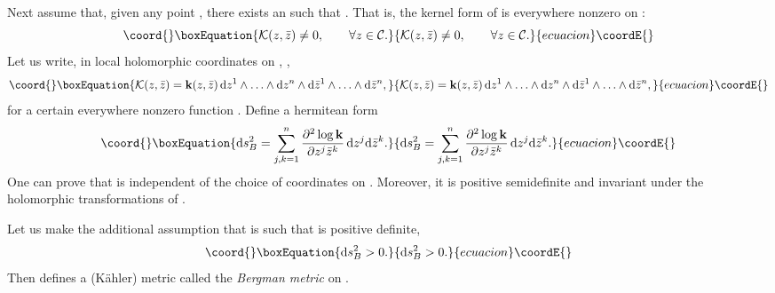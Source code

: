 \documentclass[a4paper,a4paper]{article}
\begin{document}
Next assume that, given any point \coordHE{}, there exists an 
\coordHE{} such that \coordHE{}. That is, the kernel form 
\coordHE{} of \coordHE{} is everywhere nonzero on \coordHE{}:
\begin{equation}\coord{}\boxEquation{
{\cal K}(z,\bar z)\neq 0,\qquad \forall z\in{\cal C}.
\label{knz}
}{
{\cal K}(z,\bar z)\neq 0,\qquad \forall z\in{\cal C}.
}{ecuacion}\coordE{}\end{equation}
Let us write, in local holomorphic coordinates \coordHE{} on \coordHE{},  \coordHE{},
\begin{equation}\coord{}\boxEquation{
{\cal K}(z,\bar z)={\bf k}(z, \bar z)\,{\rm d}z^1\wedge\ldots\wedge{\rm d}z^n\wedge{\rm d}\bar 
z^1\wedge\ldots\wedge{\rm d}\bar z^n,
\label{kicco}
}{
{\cal K}(z,\bar z)={\bf k}(z, \bar z)\,{\rm d}z^1\wedge\ldots\wedge{\rm d}z^n\wedge{\rm d}\bar 
z^1\wedge\ldots\wedge{\rm d}\bar z^n,
}{ecuacion}\coordE{}\end{equation}
for a certain everywhere nonzero function \coordHE{}. 
Define a hermitean form \coordHE{}
\begin{equation}\coord{}\boxEquation{
{\rm d}s^2_B=\sum_{j,k=1}^n {\partial^2 \log {\bf k}\over \partial z^j \bar z^k}
\,{\rm d}z^j {\rm d}\bar z^k.
\label{bbmmff}
}{
{\rm d}s^2_B=\sum_{j,k=1}^n {\partial^2 \log {\bf k}\over \partial z^j \bar z^k}
\,{\rm d}z^j {\rm d}\bar z^k.
}{ecuacion}\coordE{}\end{equation}
One can prove that \coordHE{} is independent of the choice of coordinates 
on \coordHE{}. Moreover, it is positive semidefinite and invariant under 
the holomorphic transformations of \coordHE{}.

Let us make the additional assumption that \coordHE{} is such that \coordHE{} 
is positive definite,
\begin{equation}\coord{}\boxEquation{
{\rm d}s^2_B>0.
\label{posdef}
}{
{\rm d}s^2_B>0.
}{ecuacion}\coordE{}\end{equation}
Then \coordHE{} defines a (K\"ahler) metric  called the {\it Bergman metric} 
on \coordHE{}.
\end{document}
